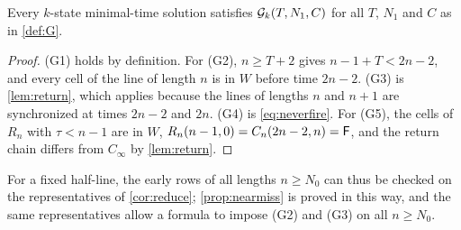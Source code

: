 \begin{lemma}\label{lem:G}
Every $k$-state minimal-time solution satisfies $\mathcal G_k(T,N_1,C)$ for all $T$,
$N_1$ and $C$ as in \cref{def:G}.
\end{lemma}

\begin{proof}
(G1) holds by definition. For (G2), $n\ge T+2$ gives $n-1+T<2n-2$, and every
cell of the line of length $n$ is in $W$ before time $2n-2$. (G3) is
\cref{lem:return}, which applies because the lines of lengths $n$ and $n+1$
are synchronized at times $2n-2$ and $2n$. (G4) is \eqref{eq:neverfire}. For
(G5), the cells of $R_n$ with $\tau<n-1$ are in $W$,
$R_n(n-1,0)=C_n(2n-2,n)=\mathsf F$, and the return chain differs from $C_\infty$ by
\cref{lem:return}.
\end{proof}

For a fixed half-line, the early rows of all lengths $n\ge N_0$ can thus be
checked on the representatives of \cref{cor:reduce}; \cref{prop:nearmiss} is
proved in this way, and the same representatives allow a formula to impose (G2)
and (G3) on all $n\ge N_0$.
